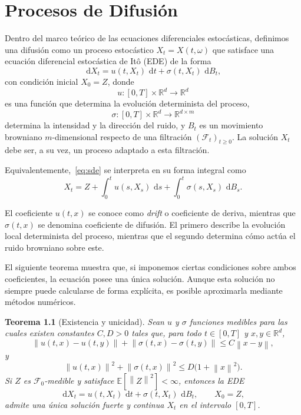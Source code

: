 \documentclass[12pt, a4paper]{report}
\theoremstyle{plain}
\newtheorem{theorem}{Teorema}[chapter]
\theoremstyle{definition}
\theoremstyle{remark}
\newcommand{\R}{\mathbb{R}}
\newcommand{\E}{\mathbb{E}}
\newcommand{\F}{\mathcal{F}}
\newcommand{\dd}{\,\mathrm{d}}
\newcommand{\norm}[1]{\left\|#1\right\|}
\begin{document}
\chapter{Procesos de Difusión}
\label{chap:difusion}

Dentro del marco teórico de las ecuaciones diferenciales estocásticas, definimos una difusión como un proceso estocástico $X_t = X(t,\omega)$ que satisface una ecuación diferencial estocástica de Itô (EDE) de la forma
\begin{equation}
  \dd X_t = u(t,X_t)\,\dd t + \sigma(t,X_t)\,\dd B_t,
  \label{eq:sde}
\end{equation}
con condición inicial $X_0 = Z$, donde
\[
  u : [0,T] \times \R^d \longrightarrow \R^d
\]
es una función que determina la evolución determinista del proceso,
\[
  \sigma : [0,T] \times \R^d \longrightarrow \R^{d \times m}
\]
determina la intensidad y la dirección del ruido, y $B_t$ es un movimiento browniano $m$-dimensional respecto de una filtración $(\F_t)_{t \geq 0}$. La solución $X_t$ debe ser, a su vez, un proceso adaptado a esta filtración.

Equivalentemente,~\eqref{eq:sde} se interpreta en su forma integral como
\begin{equation}
  X_t = Z + \int_0^t u(s,X_s)\,\dd s + \int_0^t \sigma(s,X_s)\,\dd B_s.
  \label{eq:sde-integral}
\end{equation}

El coeficiente $u(t,x)$ se conoce como \emph{drift} o coeficiente de deriva, mientras que $\sigma(t,x)$ se denomina coeficiente de difusión. El primero describe la evolución local determinista del proceso, mientras que el segundo determina cómo actúa el ruido browniano sobre este.

El siguiente teorema muestra que, si imponemos ciertas condiciones sobre ambos coeficientes, la ecuación posee una única solución. Aunque esta solución no siempre puede calcularse de forma explícita, es posible aproximarla mediante métodos numéricos.

\begin{theorem}[Existencia y unicidad]
\label{thm:existencia-unicidad}
Sean $u$ y $\sigma$ funciones medibles para las cuales existen constantes $C, D > 0$ tales que, para todo $t \in [0,T]$ y $x, y \in \R^d$,
\begin{equation}
  \norm{u(t,x) - u(t,y)} + \norm{\sigma(t,x) - \sigma(t,y)} \leq C\norm{x - y},
  \label{eq:lipschitz}
\end{equation}
y
\begin{equation}
  \norm{u(t,x)}^2 + \norm{\sigma(t,x)}^2 \leq D\bigl(1 + \norm{x}^2\bigr).
  \label{eq:crecimiento}
\end{equation}
Si $Z$ es $\F_0$-medible y satisface $\E[\norm{Z}^2] < \infty$, entonces la EDE
\[
  \dd X_t = u(t,X_t)\,\dd t + \sigma(t,X_t)\,\dd B_t, \qquad X_0 = Z,
\]
admite una única solución fuerte y continua $X_t$ en el intervalo $[0,T]$.
\end{theorem}
\end{document}
